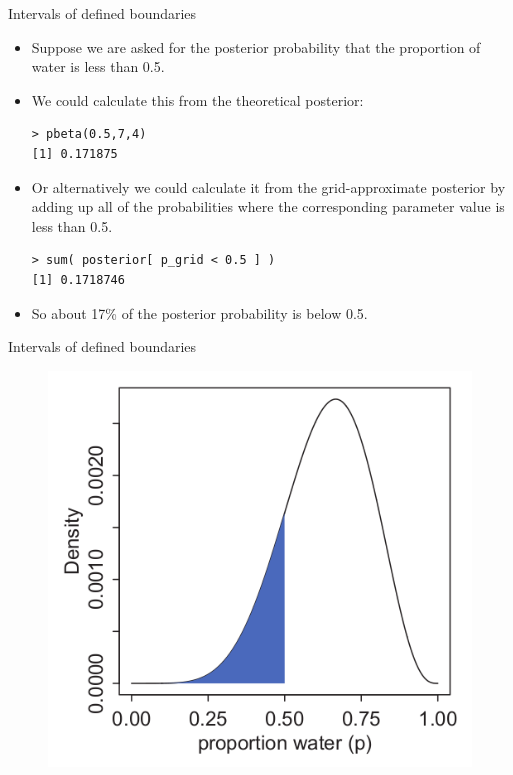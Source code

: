 \documentclass[handout]{beamer}
\begin{document}
\begin{frame}[fragile]{Intervals of defined boundaries}
\scriptsize{
\begin{itemize}

\item Suppose we are asked for the posterior probability that the proportion of water is less than 0.5. 

\item We could calculate this from the theoretical posterior:

\begin{verbatim}
> pbeta(0.5,7,4)
[1] 0.171875
\end{verbatim}



\item Or alternatively we could calculate it from the grid-approximate posterior by adding up all of the probabilities where the corresponding parameter value is less than 0.5.

\begin{verbatim}
> sum( posterior[ p_grid < 0.5 ] )
[1] 0.1718746
\end{verbatim}


\item So about 17\% of the posterior probability is below 0.5.

\end{itemize}



} 

\end{frame}



\begin{frame}{Intervals of defined boundaries}
\scriptsize{

   \begin{figure}[h!]
	\centering
	\includegraphics[scale=0.45]{pics/interval1.png}
	\end{figure} 




} 

\end{frame}
\end{document}
